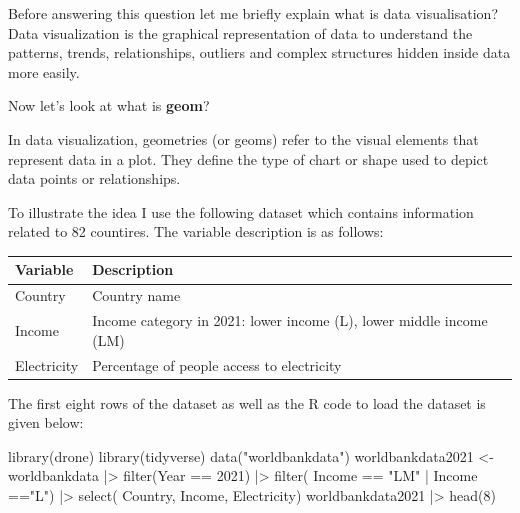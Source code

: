 \documentclass[
  letterpaper,
  DIV=11,
  numbers=noendperiod]{scrreprt}
\newenvironment{Shaded}{\begin{snugshade}}{\end{snugshade}}
\newcommand{\DecValTok}[1]{\textcolor[rgb]{0.68,0.00,0.00}{#1}}
\newcommand{\FunctionTok}[1]{\textcolor[rgb]{0.28,0.35,0.67}{#1}}
\newcommand{\NormalTok}[1]{\textcolor[rgb]{0.00,0.23,0.31}{#1}}
\newcommand{\OtherTok}[1]{\textcolor[rgb]{0.00,0.23,0.31}{#1}}
\newcommand{\SpecialCharTok}[1]{\textcolor[rgb]{0.37,0.37,0.37}{#1}}
\newcommand{\StringTok}[1]{\textcolor[rgb]{0.13,0.47,0.30}{#1}}
\begin{document}

Before answering this question let me briefly explain what is data
visualisation? Data visualization is the graphical representation of
data to understand the patterns, trends, relationships, outliers and
complex structures hidden inside data more easily.

Now let's look at what is \textbf{geom}?

In data visualization, geometries (or geoms) refer to the visual
elements that represent data in a plot. They define the type of chart or
shape used to depict data points or relationships.

To illustrate the idea I use the following dataset which contains
information related to 82 countires. The variable description is as
follows:

\begin{table}
\centering
\begin{tabular}[t]{l|l}
\hline
Variable & Description\\
\hline
Country & Country name\\
\hline
Income & Income category in 2021: lower income (L), lower middle income (LM)\\
\hline
Electricity & Percentage of people access to electricity\\
\hline
\end{tabular}
\end{table}

The first eight rows of the dataset as well as the R code to load the
dataset is given below:

\begin{Shaded}
\begin{Highlighting}[]
\FunctionTok{library}\NormalTok{(drone)}
\FunctionTok{library}\NormalTok{(tidyverse)}
\FunctionTok{data}\NormalTok{(}\StringTok{"worldbankdata"}\NormalTok{)}
\NormalTok{worldbankdata2021 }\OtherTok{\textless{}{-}}\NormalTok{ worldbankdata }\SpecialCharTok{|\textgreater{}} \FunctionTok{filter}\NormalTok{(Year }\SpecialCharTok{==} \DecValTok{2021}\NormalTok{) }\SpecialCharTok{|\textgreater{}}
  \FunctionTok{filter}\NormalTok{( Income }\SpecialCharTok{==} \StringTok{"LM"} \SpecialCharTok{|}\NormalTok{ Income }\SpecialCharTok{==}\StringTok{"L"}\NormalTok{) }\SpecialCharTok{|\textgreater{}} 
  \FunctionTok{select}\NormalTok{( Country, Income, Electricity)}
\NormalTok{worldbankdata2021 }\SpecialCharTok{|\textgreater{}} \FunctionTok{head}\NormalTok{(}\DecValTok{8}\NormalTok{)}
\end{Highlighting}
\end{Shaded}
\end{document}
